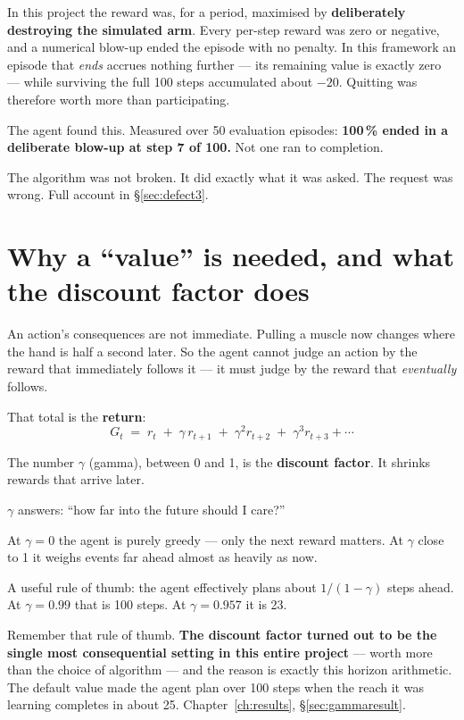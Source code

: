 \begin{trap}
In this project the reward was, for a period, maximised by \textbf{deliberately
destroying the simulated arm}. Every per-step reward was zero or negative, and a
numerical blow-up ended the episode with no penalty. In this framework an episode
that \emph{ends} accrues nothing further --- its remaining value is exactly zero
--- while surviving the full 100 steps accumulated about $-20$. Quitting was
therefore worth more than participating.

The agent found this. Measured over 50 evaluation episodes: \textbf{100\,\% ended
in a deliberate blow-up at step 7 of 100.} Not one ran to completion.

The algorithm was not broken. It did exactly what it was asked. The request was
wrong. Full account in \S\ref{sec:defect3}.
\end{trap}

\section{Why a ``value'' is needed, and what the discount factor does}
\label{sec:critic}

An action's consequences are not immediate. Pulling a muscle now changes where
the hand is half a second later. So the agent cannot judge an action by the
reward that immediately follows it --- it must judge by the reward that
\emph{eventually} follows.

That total is the \textbf{return}:
\[
G_t \;=\; r_t \;+\; \gamma\, r_{t+1} \;+\; \gamma^2 r_{t+2} \;+\; \gamma^3 r_{t+3} + \cdots
\]

The number $\gamma$ (gamma), between 0 and 1, is the \textbf{discount factor}. It
shrinks rewards that arrive later.

\begin{plain}
$\gamma$ answers: ``how far into the future should I care?''

At $\gamma = 0$ the agent is purely greedy --- only the next reward matters. At
$\gamma$ close to 1 it weighs events far ahead almost as heavily as now.

A useful rule of thumb: the agent effectively plans about $1/(1-\gamma)$ steps
ahead. At $\gamma = 0.99$ that is 100 steps. At $\gamma = 0.957$ it is 23.
\end{plain}

\begin{why}
Remember that rule of thumb. \textbf{The discount factor turned out to be the
single most consequential setting in this entire project} --- worth more than the
choice of algorithm --- and the reason is exactly this horizon arithmetic. The
default value made the agent plan over 100 steps when the reach it was learning
completes in about 25. Chapter~\ref{ch:results}, \S\ref{sec:gammaresult}.
\end{why}


